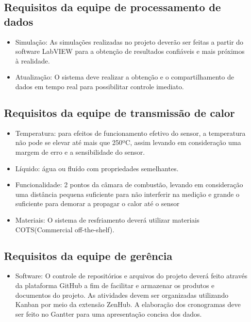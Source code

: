 \subsection{Requisitos da equipe de processamento de dados}
\begin{itemize}
\item Simulação: As simulações realizadas no projeto deverão ser feitas a partir do software LabVIEW para a obtenção de resultados confiáveis e mais próximos à realidade.
\item Atualização: O sistema deve realizar a obtenção e o compartilhamento de dados em tempo real para possibilitar controle imediato.
\end{itemize}

\subsection{Requisitos da equipe de transmissão de calor}
\begin{itemize}
\item Temperatura: para efeitos de funcionamento efetivo do sensor, a temperatura não pode se elevar até mais que 250ºC, assim levando em consideração uma margem de erro e a sensibilidade do sensor. 
\item Líquido: água ou fluído com propriedades semelhantes.
\item Funcionalidade: 2 pontos da câmara de combustão, levando em consideração uma distância pequena suficiente para não interferir na medição e grande o suficiente para demorar a propagar o calor até o sensor
\item Materiais: O sistema de resfriamento deverá utilizar materiais COTS(Commercial off-the-shelf).
\end{itemize}

\subsection{Requisitos da equipe de gerência}
\begin{itemize}
\item Software: O controle de repositórios e arquivos do projeto deverá feito através da plataforma GitHub a fim de facilitar e armazenar os produtos e documentos do projeto. As atividades devem ser organizadas utilizando Kanban por meio da extensão ZenHub. A elaboração dos cronogramas deve ser feito no Gantter para uma apresentação concisa dos dados.
\end{itemize}
